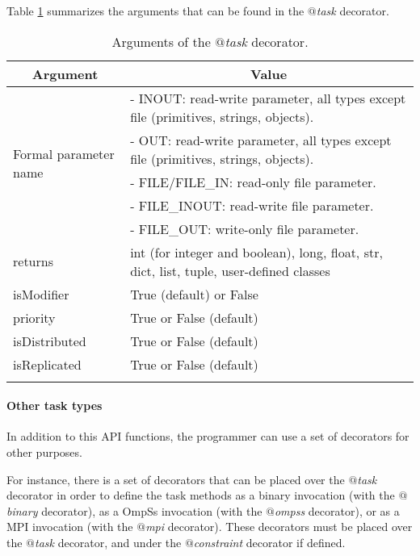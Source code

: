 Table \ref{tab:task_decorator_arguments} summarizes the arguments that can be found in the {\it $@$task} decorator.

\bgroup
  \def\arraystretch{1.5}%
  \begin{longtable}{| p{} | p{} |}
    \hline
    \multicolumn{1}{|c|}{{\bf Argument }}    &  \multicolumn{1}{c|}{{\bf Value }}\\
    \hline
    \multirow{5}{*}{Formal parameter name}  &  - INOUT: read-write parameter, all types except file (primitives, strings, objects). \\
    & - OUT: read-write parameter, all types except file (primitives, strings, objects). \\
    & - FILE/FILE\_IN: read-only file parameter. \\
    & - FILE\_INOUT: read-write file parameter. \\
    & - FILE\_OUT: write-only file parameter. \\
    \hline
    returns & int (for integer and boolean), long, float, str, dict, list, tuple, user-defined classes \\
    \hline
    isModifier &  True (default) or False \\
    \hline
    priority  & True or False (default) \\
    \hline
    isDistributed & True or False (default) \\
    \hline
    isReplicated  & True or False (default) \\
    \hline
    \caption{Arguments of the {\it $@$task} decorator.}
    \label{tab:task_decorator_arguments}
  \end{longtable}
\egroup


\paragraph{Other task types}
\label{par:other_decorators}

In addition to this API functions, the programmer can use a set of decorators for other purposes.

For instance, there is a set of decorators that can be placed over the {\it $@$task} decorator in order to 
define the task methods as a binary invocation (with the {\it $@$binary} decorator), as a OmpSs invocation 
(with the {\it $@$ompss} decorator), or as a MPI invocation (with the {\it $@$mpi} decorator).
These decorators must be placed over the {\it $@$task} decorator, and under the {\it $@$constraint} decorator if 
defined.

